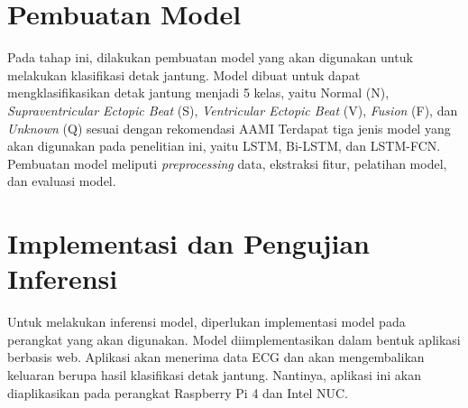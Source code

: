\section{Pembuatan Model}
\label{subsec: metodologi-pembuatan-model}
Pada tahap ini, dilakukan pembuatan model yang akan digunakan untuk melakukan klasifikasi detak jantung.
Model dibuat untuk dapat mengklasifikasikan detak jantung menjadi 5 kelas, yaitu Normal (N), \textit{Supraventricular Ectopic Beat} (S), \textit{Ventricular Ectopic Beat} (V), \textit{Fusion} (F), dan \textit{Unknown} (Q) sesuai dengan rekomendasi AAMI \parencite{associationfortheadvancementofmedicalinstrumentationTestingReportingPerformance1998}
Terdapat tiga jenis model yang akan digunakan pada penelitian ini, yaitu LSTM, Bi-LSTM, dan LSTM-FCN.
Pembuatan model meliputi \textit{preprocessing} data, ekstraksi fitur, pelatihan model, dan evaluasi model.

\section{Implementasi dan Pengujian Inferensi}
\label{subsec: metodologi-implementasi}

Untuk melakukan inferensi model, diperlukan implementasi model pada perangkat yang akan digunakan.
Model diimplementasikan dalam bentuk aplikasi berbasis web.
Aplikasi akan menerima data ECG dan akan mengembalikan keluaran berupa hasil klasifikasi detak jantung.
Nantinya, aplikasi ini akan diaplikasikan pada perangkat Raspberry Pi 4 dan Intel NUC.



